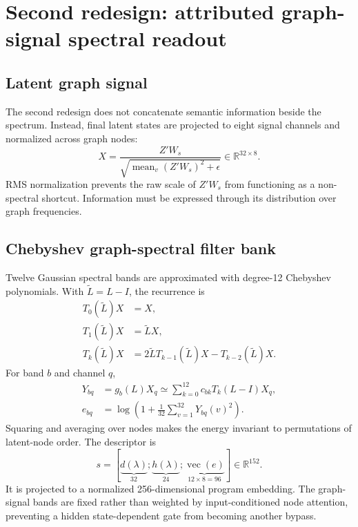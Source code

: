 \documentclass[11pt,a4paper]{article}
\newcommand{\R}{\mathbb{R}}
\newcommand{\mean}{\operatorname{mean}}
\begin{document}
\section{Second redesign: attributed graph-signal spectral readout}

\subsection{Latent graph signal}

The second redesign does not concatenate semantic information beside the
spectrum. Instead, final latent states are projected to eight signal channels
and normalized across graph nodes:
\begin{equation}
X=\frac{Z'W_s}{
\sqrt{\mean_v(Z'W_s)^2+\epsilon}}
\in\R^{32\times8}.
\end{equation}
RMS normalization prevents the raw scale of $Z'W_s$ from functioning as a
non-spectral shortcut. Information must be expressed through its distribution
over graph frequencies.

\subsection{Chebyshev graph-spectral filter bank}

Twelve Gaussian spectral bands are approximated with degree-12 Chebyshev
polynomials. With $\widetilde L=L-I$, the recurrence is
\begin{align}
T_0(\widetilde L)X&=X,\\
T_1(\widetilde L)X&=\widetilde L X,\\
T_k(\widetilde L)X&=2\widetilde L T_{k-1}(\widetilde L)X
-T_{k-2}(\widetilde L)X.
\end{align}
For band $b$ and channel $q$,
\begin{align}
Y_{bq}&=g_b(L)X_q\simeq
\sum_{k=0}^{12}c_{bk}T_k(L-I)X_q,\\
e_{bq}&=\log\left(1+
\frac{1}{32}\sum_{v=1}^{32}Y_{bq}(v)^2\right).
\end{align}
Squaring and averaging over nodes makes the energy invariant to permutations
of latent-node order. The descriptor is
\begin{equation}
s=\left[
\underbrace{d(\lambda)}_{32};
\underbrace{h(\lambda)}_{24};
\underbrace{\operatorname{vec}(e)}_{12\times8=96}
\right]\in\R^{152}.
\end{equation}
It is projected to a normalized 256-dimensional program embedding. The
graph-signal bands are fixed rather than weighted by input-conditioned node
attention, preventing a hidden state-dependent gate from becoming another
bypass.
\end{document}
